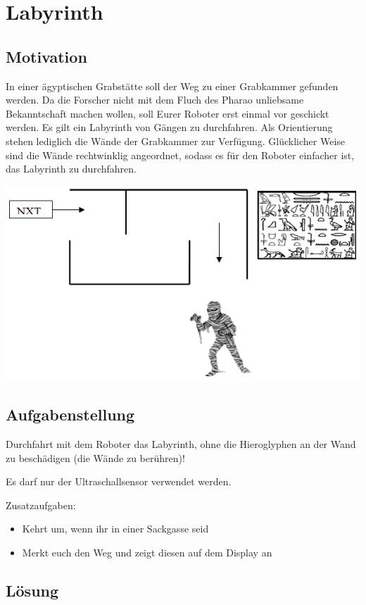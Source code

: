 \chapter{Labyrinth}
\section{Motivation}
In einer ägyptischen Grabstätte soll der Weg zu einer Grabkammer gefunden werden. Da die Forscher nicht mit dem Fluch des Pharao unliebsame Bekanntschaft machen wollen, soll Eurer Roboter erst einmal vor geschickt werden. Es gilt ein Labyrinth von Gängen zu durchfahren. Als Orientierung stehen lediglich die Wände der Grabkammer zur Verfügung. Glücklicher Weise sind die Wände rechtwinklig angeordnet, sodass es für den Roboter einfacher ist, das Labyrinth zu durchfahren. 

\begin{capfigure}[Labyrinth]
	\includegraphics[width=\textwidth]{images/labyrinth}
\end{capfigure}

\section{Aufgabenstellung}
Durchfahrt mit dem Roboter das Labyrinth, ohne die Hieroglyphen an der Wand zu beschädigen (die Wände zu berühren)!

Es darf nur der Ultraschallsensor verwendet werden.

Zusatzaufgaben:
\begin{itemize}
	\item Kehrt um, wenn ihr in einer Sackgasse seid
	\item Merkt euch den Weg und zeigt diesen auf dem Display an
\end{itemize}
\section{Lösung}